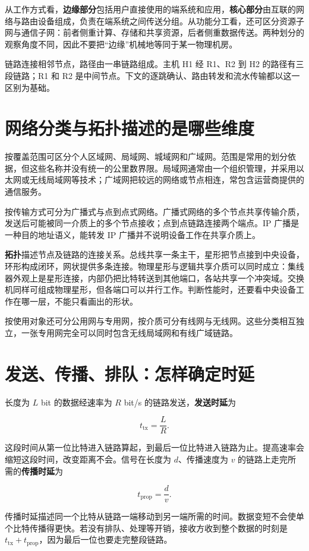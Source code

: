 从工作方式看，\textbf{边缘部分}包括用户直接使用的端系统和应用，\textbf{核心部分}由互联的网络与路由设备组成，负责在端系统之间传送分组。从功能分工看，还可区分资源子网与通信子网：前者侧重计算、存储和共享资源，后者侧重数据传送。两种划分的观察角度不同，因此不要把``边缘''机械地等同于某一物理机房。

链路连接相邻节点，路径由一串链路组成。主机 H1 经 R1、R2 到 H2 的路径有三段链路；R1 和 R2 是中间节点。下文的逐跳确认、路由转发和流水传输都以这一区别为基础。

\section{网络分类与拓扑描述的是哪些维度}\label{CN01-02}

按覆盖范围可区分个人区域网、局域网、城域网和广域网。范围是常用的划分依据，但这些名称并没有统一的公里数界限。局域网通常由一个组织管理，并采用以太网或无线局域网等技术；广域网把较远的网络或节点相连，常包含运营商提供的通信服务。

按传输方式可分为广播式与点到点式网络。广播式网络的多个节点共享传输介质，发送后可能被同一介质上的多个节点接收；点到点链路连接两个端点。IP 广播是一种目的地址语义，能转发 IP 广播并不说明设备工作在共享介质上。

\textbf{拓扑}描述节点及链路的连接关系。总线共享一条主干，星形把节点接到中央设备，环形构成闭环，网状提供多条连接。物理星形与逻辑共享介质可以同时成立：集线器外观上是星形连接，内部仍把比特转送到其他端口，各站共享一个冲突域。交换机同样可组成物理星形，但各端口可以并行工作。判断性能时，还要看中央设备工作在哪一层，不能只看画出的形状。

按使用对象还可分公用网与专用网，按介质可分有线网与无线网。这些分类相互独立，一张专用网完全可以同时包含无线局域网和有线广域链路。

\section{发送、传播、排队：怎样确定时延}\label{CN01-03}

长度为 \(L\) bit 的数据经速率为 \(R\) bit/s 的链路发送，\textbf{发送时延}为

\[t_{\mathrm{tx}}=\frac{L}{R}.\]

这段时间从第一位比特进入链路算起，到最后一位比特进入链路为止。提高速率会缩短这段时间，改变距离不会。信号在长度为 \(d\)、传播速度为 \(v\) 的链路上走完所需的\textbf{传播时延}为

\[t_{\mathrm{prop}}=\frac{d}{v}.\]

传播时延描述同一个比特从链路一端移动到另一端所需的时间。数据变短不会使单个比特传播得更快。若没有排队、处理等开销，接收方收到整个数据的时刻是 \(t_{\mathrm{tx}}+t_{\mathrm{prop}}\)，因为最后一位也要走完整段链路。

